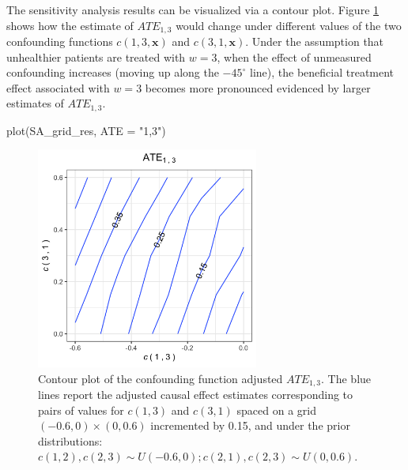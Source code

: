 


\begin{Schunk}
\end{Schunk}

The sensitivity analysis results can be visualized via a contour plot. Figure \ref{fig:p_contour} shows how the estimate of $ATE_{1,3}$ would change under different 
 values of the two confounding functions $c(1,3,)$ and $c(3,1,)$.   Under the assumption that unhealthier patients are treated with $w=3$, when the effect of unmeasured confounding increases (moving up along the $-45^{\circ}$ line), the beneficial treatment effect associated with $w=3$ becomes more pronounced evidenced by larger estimates of $ATE_{1,3}$. 

\begin{Schunk}
\begin{Sinput}
plot(SA_grid_res, ATE = "1,3")
\end{Sinput}
\end{Schunk}

\begin{figure}[htbp]
\centering
\includegraphics[width = 0.65\textwidth]{p_contour.png}
\caption{Contour plot of the confounding function adjusted $ATE_{1,3}$. The blue lines report the adjusted causal effect estimates corresponding to pairs of values for $c(1,3)$ and $c(3,1)$ spaced on a grid $(-0.6, 0) \times (0, 0.6)$ incremented by 0.15, and under the prior distributions: $c(1,2), c(2,3) \sim U(-0.6,0);  c(2,1), c(2,3) \sim U(0, 0.6)$. }
\label{fig:p_contour}
\end{figure}



